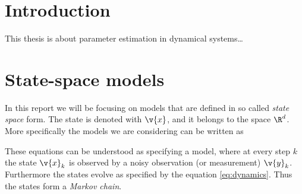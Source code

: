 \documentclass[english,12pt]{article}
\begin{document}

\makecoverpage


%


\tableofcontents

%


\cleardoublepage
\storeinipagenumber
{}
\setcounter{page}{1}


\section{Introduction}

\thispagestyle{empty}

This thesis is about parameter estimation
in dynamical systems\ldots


\clearpage

\section{State-space models}

In this report we will be focusing on models that
are defined in so called \emph{state space} form.
The state is denoted with $\v{x}$, and it belongs to the
space $\R^d$.
More specifically the models we are considering can be written as

These equations can be understood as specifying a model,
where at every step $k$ the state $\v{x}_k$ is observed
by a noisy observation (or measurement) $\v{y}_k$. Furthermore the states
evolve as specified by the equation \eqref{eq:dynamics}.
Thus the states form a \emph{Markov chain}. 
\end{document}
